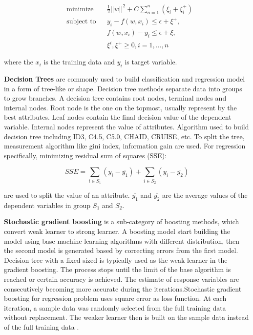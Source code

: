 \documentclass[12pt,english]{report}
\begin{document}
\begin{equation}
    \begin{aligned}
     &   \text{minimize}
     & & \frac{1}{2} {||w||^2} + C \sum_{n=1}^{n}(\xi_i + \xi_i^+) \\
     & \text{subject to} 
     & & y_{i} - f(w,x_i) \leq  \epsilon + \xi^+, \\
     &&& f(w,x_i) - y_{i} \leq \epsilon + \xi, \\
     &&& \xi^i, \xi^+ \geq 0, i=1,\dots,n
    \end{aligned}
\end{equation}

where the $x_i$ is the training data and $y_i$ is target variable.


\textbf{Decision Trees} are commonly used to build classification and
regression model in a form of tree-like or shape. Decision tree methods
separate data into groups to grow branches. A decision tree contains root
nodes,
terminal nodes and internal nodes. Root node is the one on the topmost, usually
represent by the best attributes. Leaf nodes contain the final decision value
of the dependent variable. Internal nodes represent the value of attributes.
Algorithm used to build decision tree including ID3, C4.5, C5.0, CHAID, CRUISE,
etc. To split the tree, measurement algorithm like gini index, information gain
are used. For regression specifically, minimizing  residual sum of squares
(SSE):

\begin{equation}
	SSE = \sum_{i \in S_1} (y_i - \overline{y_1}) + \sum_{i \in S_2} (y_i -
	\overline{y_2})
\end{equation}

are used to split the value of an attribute. $\overline{y_1}$ and
$\overline{y_2}$ are the average values of the dependent variables in group
$S_1$ and $S_2$. 


\textbf{Stochastic gradient boosting} is a sub-category of boosting methods,
which convert weak learner to strong learner. A boosting model start building
the model using base machine learning algorithms with different distribution,
then the second model is generated based by correcting errors from the first
model. Decision tree with a fixed sized is typically used as the weak learner
in the gradient boosting.
The process stops until the limit of the base algorithm is reached or
certain accuracy is achieved. The estimate of response variables are 
consecutively becoming more accurate during the iterations.Stochastic gradient
boosting for regression problem uses square error as loss function. At each
iteration, a sample data was randomly selected from the full training data
without replacement. The weaker learner then is built on the sample data
instead of the full training data \citep{FRIEDMAN2002367}. 
\end{document}
